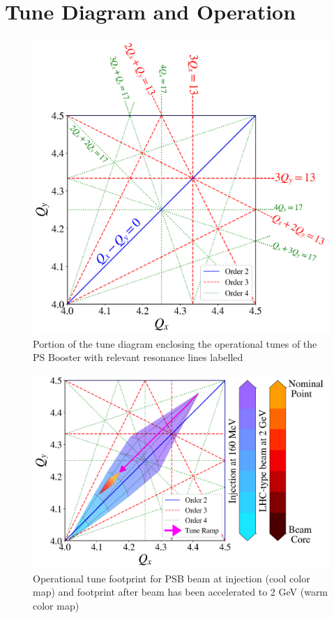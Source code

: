 \section{Tune Diagram and Operation}

\begin{figure}[H]
    \centering
    \includegraphics[width=\linewidth]{chapter5/psb_td.png}
    \caption{Portion of the tune diagram enclosing the operational tunes of the PS Booster with relevant resonance lines labelled}
    \label{fig:psbtd}
\end{figure}

\begin{figure}[H]
    \centering
    \includegraphics[width=\linewidth,keepaspectratio]{chapter5/operational.png}
    \caption{Operational tune footprint for PSB beam at injection (cool color map) and footprint after beam has been accelerated to 2 GeV (warm color map)}
    \label{fig:operational_psb}
\end{figure}

